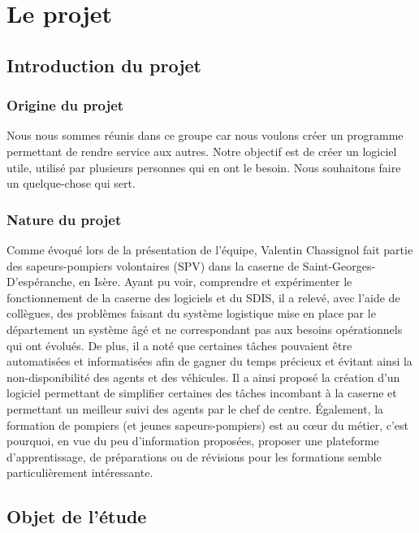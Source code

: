 \section{Le projet}

\subsection{Introduction du projet}
\subsubsection{Origine du projet}
Nous nous sommes réunis dans ce groupe car nous voulons créer un programme permettant de rendre service aux autres. Notre objectif est de créer un logiciel utile, utilisé par plusieurs personnes qui en ont le besoin. Nous souhaitons faire un quelque-chose qui sert.

\subsubsection{Nature du projet}
Comme évoqué lors de la présentation de l'équipe, Valentin Chassignol fait partie des sapeurs-pompiers volontaires (SPV) dans la caserne de Saint-Georges-D'espéranche, en Isère. Ayant pu voir, comprendre et expérimenter le fonctionnement de la caserne des logiciels et du SDIS, il a relevé, avec l'aide de collègues, des problèmes faisant du système logistique mise en place par le département un système âgé et ne correspondant pas aux besoins opérationnels qui ont évolués. De plus, il a noté que certaines tâches pouvaient être automatisées et informatisées afin de gagner du temps précieux et évitant ainsi la non-disponibilité des agents et des véhicules. Il a ainsi proposé la création d'un logiciel permettant de simplifier certaines des tâches incombant à la caserne et permettant un meilleur suivi des agents par le chef de centre. Également, la formation de pompiers (et jeunes sapeurs-pompiers) est au cœur du métier, c'est pourquoi, en vue du peu d'information proposées, proposer une plateforme d'apprentissage, de préparations ou de révisions pour les formations semble particulièrement intéressante.


\subsection{Objet de l'étude}


